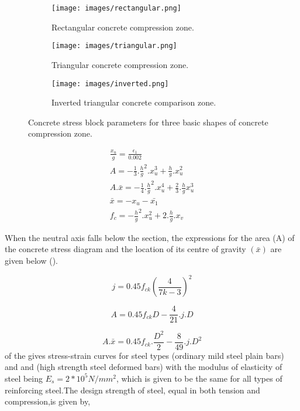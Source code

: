 \begin{figure}
\centering
\begin{subfigure}{0.5\textwidth}
\texttt{[image: images/rectangular.png]}
\caption{Rectangular concrete compression zone.}
\label{fig:rectangular}
\end{subfigure}
%
\begin{subfigure}{0.5\textwidth}
\centering
\texttt{[image: images/triangular.png]}
\caption{Triangular concrete compression zone.}
\label{fig:triangular}
\end{subfigure}
%
\begin{subfigure}{0.5\textwidth}
\centering
\texttt{[image: images/inverted.png]}
\caption{Inverted triangular concrete comparison zone.}
\label{fig:inverted}
\end{subfigure}
\caption{Concrete stress block parameters for three basic shapes of concrete compression zone.}
\label{fig:concrete}
\end{figure}

\begin{align}
\frac{x_u}{g}=\frac{\epsilon_1}{0.002}\\
A=-\frac{1}{3}.\frac{h}{g}^2.x_u^3+\frac{h}{g}.x_u^2\\
A.\bar{x}=-\frac{1}{4}.\frac{h}{g}^2.x_u^4+\frac{2}{3}.\frac{h}{g}x_u^3\\
\bar{x}=-x_u-\bar{x_1}\\
f_c=-\frac{h}{g}^2.x_u^2+2.\frac{h}{g}.x_v
\end{align}

When the neutral axis falls below the section, the expressions for the
area (A) of the concrete stress diagram and the location of its centre
of gravity $(\bar x)$ are given below ().

\begin{equation}
j=0.45f_{ck}\left(\frac{4}{7k-3}\right)^2
\end{equation}

\begin{equation}
A=0.45f_{ck}D-\frac{4}{21}.j.D
\end{equation}

\begin{equation}
A.\bar{x}=0.45f_{ck}.\frac{D^2}{2}-\frac{8}{49}.j.D^2
\end{equation}
 of the  gives stress-strain curves for
steel types  (ordinary mild steel plain bars) and {\fefouronefive} and
{\fefivezerozero} (high strength steel deformed bars) with the modulus
of elasticity of steel being $E_s = 2*10^5 N/mm^2$, which is given to be
the same for all types of reinforcing steel.The design strength of
steel, equal in both tension and compression,is given by,

